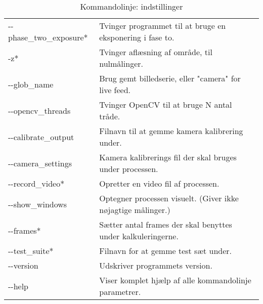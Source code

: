 \begin{table}[h]
	\centering
	\label{kommandolinjeindstilling}
	\begin{tabular}{ll}
		-{}-phase\_two\_exposure* & Tvinger programmet til at bruge en eksponering i fase to. \\
-z* & Tvinger aflæsning af område, til nulmålinger. \\
-{}-glob\_name & Brug gemt billedserie, eller "camera" for live feed. \\
-{}-opencv\_threads & Tvinger OpenCV til at bruge N antal tråde. \\
-{}-calibrate\_output & Filnavn til at gemme kamera kalibrering under. \\
-{}-camera\_settings & Kamera kalibrerings fil der skal bruges under processen. \\
-{}-record\_video* & Opretter en video fil af processen. \\
-{}-show\_windows & Optegner processen visuelt. (Giver ikke nøjagtige målinger.) \\
-{}-frames* & Sætter antal frames der skal benyttes under kalkuleringerne. \\
-{}-test\_suite* & Filnavn for at gemme test sæt under. \\
-{}-version & Udskriver programmets version. \\
-{}-help & Viser komplet hjælp af alle kommandolinje parametrer. \\
	\end{tabular}
	\caption{Kommandolinje: indstillinger}
\end{table}
